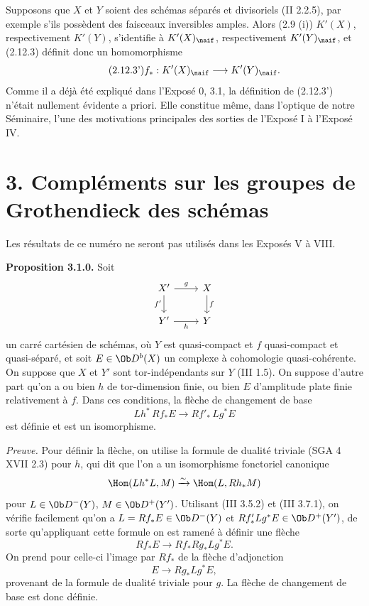 \documentclass[11pt]{article}
\begin{document}
Supposons que \(X\) et \(Y\) soient des schémas séparés et divisoriels (II 2.2.5), par exemple s'ils possèdent des faisceaux inversibles amples. Alors (2.9 (i)) \(K'(X)\), respectivement \(K'(Y)\), s'identifie à \(K'(X)_{\naif}\), respectivement \(K'(Y)_{\naif}\), et (2.12.3) définit donc un homomorphisme
\begin{equation}\tag{2.12.3'}
 f_*:K'(X)_{\naif}\longrightarrow K'(Y)_{\naif}.
\end{equation}
Comme il a déjà été expliqué dans l'Exposé 0, 3.1, la définition de (2.12.3') n'était nullement évidente a priori. Elle constitue même, dans l'optique de notre Séminaire, l'une des motivations principales des sorties de l'Exposé I à l'Exposé IV.

\section*{3. Compléments sur les groupes de Grothendieck des schémas}

Les résultats de ce numéro ne seront pas utilisés dans les Exposés V à VIII.

\textbf{Proposition 3.1.0.} Soit
\[
\begin{tikzcd}
X' \arrow[r,"g"]\arrow[d,"f'"'] & X\arrow[d,"f"]\\
Y' \arrow[r,"h"'] & Y
\end{tikzcd}
\]
un carré cartésien de schémas, où \(Y\) est quasi-compact et \(f\) quasi-compact et quasi-séparé, et soit \(E\in\Ob D^b(X)\) un complexe à cohomologie quasi-cohérente. On suppose que \(X\) et \(Y'\) sont tor-indépendants sur \(Y\) (III 1.5). On suppose d'autre part qu'on a ou bien \(h\) de tor-dimension finie, ou bien \(E\) d'amplitude plate finie relativement à \(f\). Dans ces conditions, la flèche de changement de base
\[
 Lh^*\,Rf_*E\longrightarrow Rf'_*\,Lg^*E
\]
est définie et est un isomorphisme.

\emph{Preuve.} Pour définir la flèche, on utilise la formule de dualité triviale (SGA 4 XVII 2.3) pour \(h\), qui dit que l'on a un isomorphisme fonctoriel canonique
\[
 \Hom(Lh^*L,M)\xrightarrow{\sim}\Hom(L,Rh_*M)
\]
pour \(L\in\Ob D^-(Y)\), \(M\in\Ob D^+(Y')\). Utilisant (III 3.5.2) et (III 3.7.1), on vérifie facilement qu'on a \(L=Rf_*E\in\Ob D^-(Y)\) et \(Rf'_*Lg^*E\in\Ob D^+(Y')\), de sorte qu'appliquant cette formule on est ramené à définir une flèche
\[
 Rf_*E\longrightarrow Rf_*Rg_*Lg^*E.
\]
On prend pour celle-ci l'image par \(Rf_*\) de la flèche d'adjonction
\[
 E\longrightarrow Rg_*Lg^*E,
\]
provenant de la formule de dualité triviale pour \(g\). La flèche de changement de base est donc définie.
\end{document}
